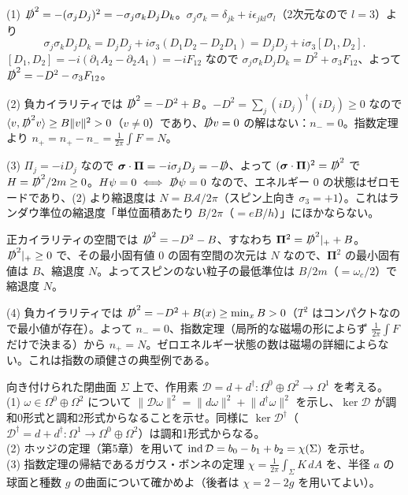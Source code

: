 \begin{solution}
(1) $\slashed D^2=-(\sigma_jD_j)^2=-\sigma_j\sigma_kD_jD_k$。$\sigma_j\sigma_k=\delta_{jk}+i\epsilon_{jkl}\sigma_l$（2次元なので $l=3$）より
\[
\sigma_j\sigma_kD_jD_k=D_jD_j+i\sigma_3(D_1D_2-D_2D_1)=D_jD_j+i\sigma_3[D_1,D_2].
\]
$[D_1,D_2]=-i(\partial_1A_2-\partial_2A_1)=-iF_{12}$ なので $\sigma_j\sigma_kD_jD_k=D^2+\sigma_3F_{12}$、よって $\slashed D^2=-D^2-\sigma_3F_{12}$。

(2) 負カイラリティでは $\slashed D^2=-D^2+B$。$-D^2=\sum_j(iD_j)^\dagger(iD_j)\ge0$ なので $\langle v,\slashed D^2v\rangle\ge B\lVert v\rVert^2>0$（$v\ne0$）であり、$\slashed D v=0$ の解はない：$n_-=0$。指数定理より $n_+=n_+-n_-=\frac1{2\pi}\int F=N$。

(3) $\Pi_j=-iD_j$ なので $\bm\sigma\cdot\bm\Pi=-i\sigma_jD_j=-\slashed D$、よって $(\bm\sigma\cdot\bm\Pi)^2=\slashed D^2$ で $H=\slashed D^2/2m\ge0$。$H\psi=0\iff\slashed D\psi=0$ なので、エネルギー $0$ の状態はゼロモードであり、(2) より縮退度は $N=B\mathcal A/2\pi$（スピン上向き $\sigma_3=+1$）。これはランダウ準位の縮退度「単位面積あたり $B/2\pi$（$=eB/h$）」にほかならない。

正カイラリティの空間では $\slashed D^2=-D^2-B$、すなわち $\bm\Pi^2=\slashed D^2|_{+}+B$。$\slashed D^2|_+\ge0$ で、その最小固有値 $0$ の固有空間の次元は $N$ なので、$\bm\Pi^2$ の最小固有値は $B$、縮退度 $N$。よってスピンのない粒子の最低準位は $B/2m$（$=\omega_c/2$）で縮退度 $N$。

(4) 負カイラリティでは $\slashed D^2=-D^2+B(x)\ge\min_xB>0$（$T^2$ はコンパクトなので最小値が存在）。よって $n_-=0$、指数定理（局所的な磁場の形によらず $\frac1{2\pi}\int F$ だけで決まる）から $n_+=N$。ゼロエネルギー状態の数は磁場の詳細によらない。これは指数の頑健さの典型例である。
\end{solution}

\begin{problem}[難易度 A]\label{ch09-prob-gb}
向き付けられた閉曲面 $\Sigma$ 上で、作用素 $\mathcal D=d+d^\dagger\colon\Omega^0\oplus\Omega^2\to\Omega^1$ を考える。\\
(1) $\omega\in\Omega^0\oplus\Omega^2$ について $\lVert\mathcal D\omega\rVert^2=\lVert d\omega\rVert^2+\lVert d^\dagger\omega\rVert^2$ を示し、$\ker\mathcal D$ が調和0形式と調和2形式からなることを示せ。同様に $\ker\mathcal D^\dagger$（$\mathcal D^\dagger=d+d^\dagger\colon\Omega^1\to\Omega^0\oplus\Omega^2$）は調和1形式からなる。\\
(2) ホッジの定理（第5章）を用いて $\operatorname{ind}\mathcal D=b_0-b_1+b_2=\chi(\Sigma)$ を示せ。\\
(3) 指数定理の帰結であるガウス・ボンネの定理 $\chi=\frac1{2\pi}\int_\Sigma K\,dA$ を、半径 $a$ の球面と種数 $g$ の曲面について確かめよ（後者は $\chi=2-2g$ を用いてよい）。
\end{problem}

